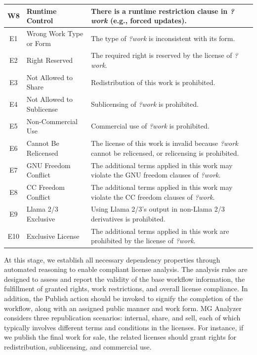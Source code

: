 \begin{table}[tp]
\begin{tabular}{|c|p{1.9cm}|p{5cm}|}
    W8 &\textcolor{Construct}{Runtime Control} & There is a runtime restriction clause in \emph{?work} (e.g., forced updates). \\ \hline

    E1 &\textcolor{Request}{Wrong Work Type or Form} & The type of \emph{?work} is inconsistent with its form. \\ \hline

    E2 &\textcolor{Request}{Right Reserved} & The required right is reserved by the license of \emph{?work}. \\ \hline
    
    E3 &\textcolor{Request}{Not Allowed to Share} & Redistribution of this work is prohibited. \\ \hline

    E4 &\textcolor{Request}{Not Allowed to Sublicense} & Sublicensing of \emph{?work} is prohibited. \\ \hline

    E5 &\textcolor{Request}{Non-Commercial Use} & Commercial use of \emph{?work} is prohibited. \\ \hline

    E6 &\textcolor{Request}{Cannot Be Relicensed} & The license of this work is invalid because \emph{?work} cannot be relicensed, or relicensing is prohibited. \\ \hline

    E7 &\textcolor{Request}{GNU Freedom Conflict} & The additional terms applied in this work may violate the GNU freedom clauses of \emph{?work}. \\ \hline

    E8 &\textcolor{Request}{CC Freedom Conflict} & The additional terms applied in this work may violate the CC freedom clauses of \emph{?work}. \\ \hline

    E9 &\textcolor{Request}{Llama 2/3 Exclusive} & Using Llama 2/3's output in non-Llama 2/3 derivatives is prohibited. \\ \hline

    E10 &\textcolor{Request}{Exclusive License} & The additional terms applied in this work are prohibited by the license of \emph{?work}. \\ \hline

    \end{tabular}
\end{table}


At this stage, we establish all necessary dependency properties through automated reasoning to enable compliant license analysis. 
The analysis rules are designed to assess and report the validity of the base workflow information, the fulfillment of granted rights, work restrictions, and overall license compliance. 
In addition, the Publish action should be invoked to signify the completion of the workflow, along with an assigned public manner and work form. 
MG Analyzer considers three republication scenarios: internal, share, and sell, each of which typically involves different terms and conditions in the licenses.
For instance, if we publish the final work for sale, the related licenses should grant rights for redistribution, sublicensing, and commercial use. 

